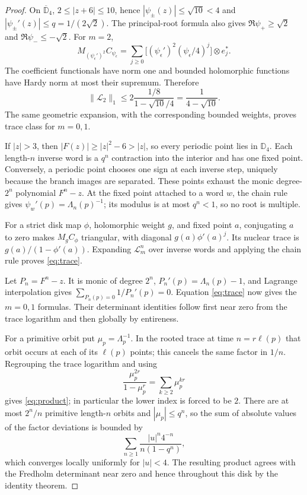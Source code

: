 \documentclass[10pt]{article}
\newcommand{\D}{\mathbb D}
\newcommand{\Lop}{\mathcal L}
\begin{document}
\begin{proof}
On $\overline{\D}_4$, $2\le|z+6|\le10$, hence
$|\psi_\pm(z)|\le\sqrt{10}<4$ and
$|\psi_\pm'(z)|\le q=1/(2\sqrt2)$.  The principal-root formula also gives
$\Re\psi_+\ge\sqrt2$ and $\Re\psi_-\le-\sqrt2$.  For $m=2$,
\[
 M_{(\psi_\epsilon')^2}C_{\psi_\epsilon}
 =\sum_{j\ge0}\bigl[(\psi_\epsilon')^2
 (\psi_\epsilon/4)^j\bigr]\otimes e_j^*.
\]
The coefficient functionals have norm one and bounded holomorphic functions have Hardy norm at most their supremum.  Therefore
\[
 \|\Lop_2\|_1\le2\frac{1/8}{1-\sqrt{10}/4}
 =\frac1{4-\sqrt{10}}.
\]
The same geometric expansion, with the corresponding bounded weights, proves trace class for $m=0,1$.

If $|z|>3$, then $|F(z)|\ge |z|^2-6>|z|$, so every periodic point lies in $\D_4$.  Each length-$n$ inverse word is a $q^n$ contraction into the interior and has one fixed point.  Conversely, a periodic point chooses one sign at each inverse step, uniquely because the branch images are separated.  These points exhaust the monic degree-$2^n$ polynomial $F^n-z$.  At the fixed point attached to a word $w$, the chain rule gives $\psi_w'(p)=\Lambda_n(p)^{-1}$; its modulus is at most $q^n<1$, so no root is multiple.

For a strict disk map $\phi$, holomorphic weight $g$, and fixed point $a$, conjugating $a$ to zero makes $M_gC_\phi$ triangular, with diagonal $g(a)\phi'(a)^j$.  Its nuclear trace is $g(a)/(1-\phi'(a))$.  Expanding $\Lop_m^n$ over inverse words and applying the chain rule proves \eqref{eq:trace}.

Let $P_n=F^n-z$.  It is monic of degree $2^n$, $P_n'(p)=\Lambda_n(p)-1$, and Lagrange interpolation gives $\sum_{P_n(p)=0}1/P_n'(p)=0$.  Equation \eqref{eq:trace} now gives the $m=0,1$ formulas.  Their determinant identities follow first near zero from the trace logarithm and then globally by entireness.

For a primitive orbit put $\mu_p=\Lambda_p^{-1}$.  In the rooted trace at time $n=r\ell(p)$ that orbit occurs at each of its $\ell(p)$ points; this cancels the same factor in $1/n$.  Regrouping the trace logarithm and using
\[
 \frac{\mu_p^{2r}}{1-\mu_p^r}=\sum_{k\ge2}\mu_p^{kr}
\]
gives \eqref{eq:product}; in particular the lower index is forced to be $2$.  There are at most $2^n/n$ primitive length-$n$ orbits and $|\mu_p|\le q^n$, so the sum of absolute values of the factor deviations is bounded by
\[
 \sum_{n\ge1}\frac{|u|^n4^{-n}}{n(1-q^n)},
\]
which converges locally uniformly for $|u|<4$.  The resulting product agrees
with the Fredholm determinant near zero and hence throughout this disk by the
identity theorem.
\end{proof}
\end{document}
